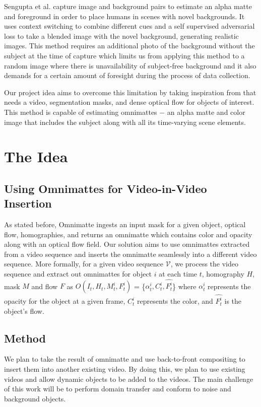 \documentclass{article}
\begin{document}
Sengupta et al.\cite{BMSengupta20} capture image and background pairs to estimate an alpha matte and foreground in order to place humans in scenes with novel backgrounds. It uses context switching to combine different cues and a self supervised adversarial loss to take a blended image with the novel background, generating realistic images. This method requires an additional photo of the background without the subject at the time of capture which limits us from applying this method to a random image where there is unavailability of subject-free background and it also demands for a certain amount of foresight during the process of data collection. 

Our project idea aims to overcome this limitation\cite{BMSengupta20} by taking inspiration from\cite{lu2021} that needs a video, segmentation masks, and dense optical flow for objects of interest. This method is capable of estimating omnimattes $-$ an alpha matte and color image that includes the subject along with all its time-varying scene elements. 


\section{The Idea}

\subsection{Using Omnimattes for Video-in-Video Insertion}
As stated before, Omnimatte ingests an input mask for a given object, optical flow, homographies, and returns an omnimatte which contains color and opacity along with an optical flow field. Our solution aims to use omnimattes extracted from a video sequence and inserts the omnimatte seamlessly into a different video sequence. More formally, for a given video sequence $\mathcal{V}$, we process the video sequence and extract out omnimattes for object $i$ at each time $t$, homography $H$, mask $M$ and flow $F$ as $O(I_t, H_t, M_t^i, F_t^i)$ = \{$\alpha_t^i, C_t^i, \hat{F_t^i}$\} where $\alpha_t^i$ represents the opacity for the object at a given frame, $C_t^i$ represents the color, and $\hat{F_t^i}$ is the object's flow.

\subsection{Method}
We plan to take the result of omnimatte and use back-to-front compositing to insert them into another existing video. By doing this, we plan to use existing videos and allow dynamic objects to be added to the videos. The main challenge of this work will be to perform domain transfer and conform to noise and background objects.
\end{document}
